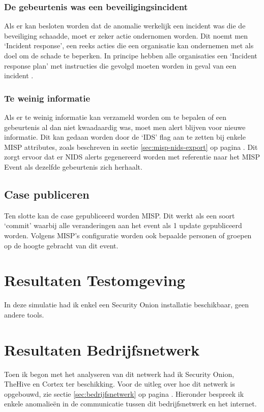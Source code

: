 \documentclass[a4paper,12pt]{report}
\begin{document}
\subsubsection{De gebeurtenis was een beveiligingsincident}
Als er kan besloten worden dat de anomalie werkelijk een incident was die de beveiliging schaadde, moet er zeker actie ondernomen worden.
Dit noemt men `Incident response', een reeks acties die een organisatie kan ondernemen met als doel om de schade te beperken.
In principe hebben alle organisaties een `Incident response plan' met instructies die gevolgd moeten worden in geval van een incident \autocite{digitalguardian:incident-response}.

\subsubsection{Te weinig informatie}
Als er te weinig informatie kan verzameld worden om te bepalen of een gebeurtenis al dan niet kwaadaardig was, moet men alert blijven voor nieuwe informatie.
Dit kan gedaan worden door de `IDS' flag aan te zetten bij enkele MISP attributes, zoals beschreven in sectie \ref{sec:misp-nids-export} op pagina \pageref{sec:misp-nids-export}.
Dit zorgt ervoor dat er NIDS alerts gegenereerd worden met referentie naar het MISP Event als dezelfde gebeurtenis zich herhaalt.

\subsection{Case publiceren}
Ten slotte kan de case gepubliceerd worden MISP.
Dit werkt als een soort `commit' waarbij alle veranderingen aan het event als 1 update gepubliceerd worden.
Volgens MISP's configuratie worden ook bepaalde personen of groepen op de hoogte gebracht van dit event.

\section{Resultaten Testomgeving}
In deze simulatie had ik enkel een Security Onion installatie beschikbaar, geen andere tools.

\section{Resultaten Bedrijfsnetwerk}
Toen ik begon met het analyseren van dit netwerk had ik Security Onion, TheHive en Cortex ter beschikking.
Voor de uitleg over hoe dit netwerk is opgebouwd, zie sectie \ref{sec:bedrijfsnetwerk} op pagina \pageref{sec:bedrijfsnetwerk}.
Hieronder bespreek ik enkele anomalieën in de communicatie tussen dit bedrijfsnetwerk en het internet.
\end{document}
